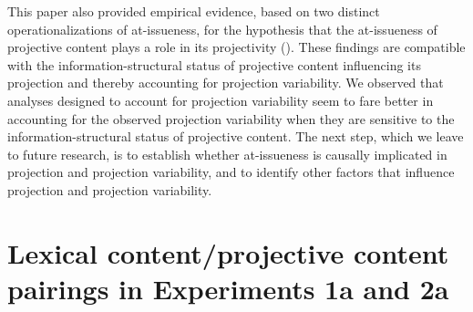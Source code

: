 \documentclass[11pt,fleqn]{article}
\newcommand{\6}{\mbox{$[\hspace*{-.6mm}[$}}
\newcommand{\9}{\mbox{$]\hspace*{-.6mm}]$}}
\begin{document}
This paper also provided empirical evidence, based on two distinct operationalizations of at-issueness, for the hypothesis that the at-issueness of projective content plays a role in its projectivity (\citealt{brst-salt10,brst-ar}). These findings are compatible with the information-structural status of projective content influencing its projection and thereby accounting for projection variability. We observed that analyses designed to account for projection variability seem to fare better in accounting for the observed projection variability when they are sensitive to the information-structural status of projective content. The next step, which we leave to future research, is to establish whether at-issueness is causally implicated in projection and projection variability, and to identify other factors that influence projection and projection variability.

\appendix

\setcounter{table}{0}
\renewcommand{\thetable}{A\arabic{table}}

\section{Lexical content/projective content pairings in Experiments 1a and 2a}\label{a-trigger-content-pairs}
\end{document}
